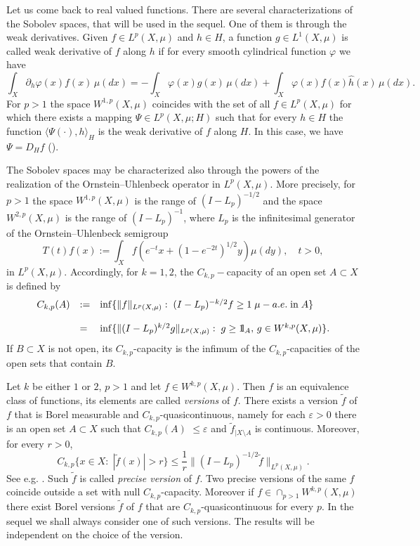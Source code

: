 \documentclass[reqno,twoside,12pt]{amsart}
\begin{document}
Let us come back to real valued  functions. There are several characterizations of the Sobolev spaces, that will be used in the sequel. One of them is through the weak derivatives. Given $f\in L^p(X, \mu)$ and $h\in H$, a function $g\in  L^1(X, \mu)$ is called weak derivative of $f$ along $h$ if for every smooth cylindrical function $\varphi$ we have
$$\int_X \partial _h \varphi(x) f(x)\, \mu(dx) = -\int_X  \varphi(x) g(x) \,\mu(dx) + \int_X \varphi(x) f(x) \hat{h}(x)\,\mu(dx).$$
For $p>1$ the space $W^{1,p}(X, \mu)$ coincides with the set of all $f\in L^p(X, \mu)$ for which there exists a mapping $\Psi \in L^p(X, \mu; H)$ such that for every $h\in H$ the function $\langle \Psi(\cdot), h\rangle_H$ is the weak derivative of $f$ along $H$. In this case, we have $\Psi = D_Hf$  (\cite[\S 5.3, Cor. 5.4.7]{Boga}). 

 
The Sobolev spaces may be characterized also through the powers of the realization of the Ornstein--Uhlenbeck operator in $L^p(X, \mu)$. More precisely, for $p>1$ the space $W^{1,p}(X, \mu)$ is the range of $(I-L_p)^{-1/2}$ and the space
$W^{2,p}(X, \mu)$ is the range of $(I-L_p)^{-1}$, where $L_p$ is the infinitesimal generator of the Ornstein--Uhlenbeck semigroup 
$$T(t)f(x) := \int_X f(e^{-t}x + (1-e^{-2t})^{1/2}y)\mu(dy), \quad t>0,  $$
in $L^p(X, \mu)$. Accordingly, for $k=1, 2$, the $C_{k,p}-$capacity of an open set $A\subset X$ is defined by 
$$\begin{array}{lll}
C_{k,p}(A) & :=  & \inf\{ \|f\|_{L^p(X, \mu)} : \; (I-L_p)^{-k/2}f \geq 1\;\mu-a.e.\;\mbox{\rm in} \;A\}
\\
\\
& = & \inf\{ \|(I-L_p)^{k/2}g\|_{L^p(X, \mu)} : \; g\geq  {1\!\!\!\;\mathrm{l}}_A, \, g\in W^{k,p}(X, \mu)\}.
\end{array}$$
If  $B\subset X$ is not open, its $C_{k,p}$-capacity is the infimum of the $C_{k,p}$-capacities of the open sets that contain $B$. 

Let $k$ be either $1$ or $2$, $p>1$ and let $f\in W^{k,p}(X, \mu)$. Then $f$ is an equivalence class of functions, its elements are called {\em versions} of $f$. There exists a   version $\tilde{f}$  of $f$ that is Borel measurable and $C_{k,p}$-quasicontinuous, namely for each ${\varepsilon} >0$ there is an open set $A\subset X$ such that $C_{k,p}(A)$  $\leq {\varepsilon}$ and $\tilde{f}_{|X\setminus A}$ is continuous. Moreover, for every $r>0$, 
\begin{equation}
\label{cap}
C_{k,p}\{ x\in X:\; | \tilde{f}(x)|>r\} \leq \frac{1}{r}\|(I-L_p)^{-1/2} \tilde{f}\|_{L^p(X, \mu)}.
\end{equation}
See e.g. \cite[Thm. 5.9.6]{Boga}. Such 
$\tilde{f}$ is called {\em precise version} of $f$.  Two precise versions of the same $f$ coincide outside a set with null $C_{k,p}$-capacity. 
Moreover if $f\in \cap_{p>1}W^{k,p}(X, \mu)$ there exist Borel versions $\tilde{f}$ of $f$  that are $C_{k,p}$-quasicontinuous for every $p$. In the sequel we shall always consider one of such versions. The results will be independent on the choice of the version. 
 
\end{document}

